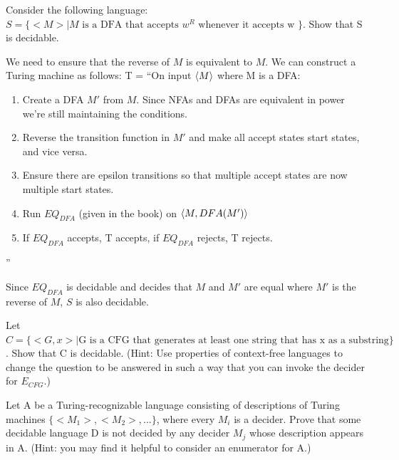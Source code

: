 \begin{problem}{3}
  Consider the following language: $S = \{<M> | M \text{ is a DFA that accepts } w^R \text{ whenever it accepts w }\}$. Show that S is
  decidable.
  \begin{solution}
    We need to ensure that the reverse of $M$ is equivalent to $M$. We can construct a Turing machine as follows:
    T = ``On input $\left \langle M \right \rangle $ where M is a DFA:
    \begin{enumerate}
      \item Create a DFA $M'$ from $M$. Since NFAs and DFAs are equivalent in power we're still maintaining the conditions.\\
      \item Reverse the transition function in $M'$ and make all accept states start states, and vice versa.\\
      \item Ensure there are epsilon transitions so that multiple accept states are now multiple start states.\\
      \item Run $EQ_{DFA}$ (given in the book) on $\left \langle M, DFA(M') \right \rangle $\\
      \item If $EQ_{DFA}$ accepts, T accepts, if $EQ_{DFA}$ rejects, T rejects.\\
    \end{enumerate}
    ''

    \noindent Since $EQ_{DFA}$ is decidable and decides that $M$ and $M'$ are equal where $M'$ is the reverse of $M$, $S$ is also
    decidable.
  \end{solution}
\end{problem}

\begin{problem}{4}
  Let $C = \{<G,x> | \text{G is a CFG that generates at least one string that has x as a substring}\}$. Show that C is decidable.
  (Hint: Use properties of context-free languages to change the question to be answered in such a way that you can
  invoke the decider for $E_{CFG}$.)
\end{problem}

\begin{problem}{5}
  Let A be a Turing-recognizable language consisting of descriptions of Turing machines $\{<M_1>, <M_2>,...\}$, where
  every $M_i$ is a decider. Prove that some decidable language D is not decided by any decider $M_j$ whose description
  appears in A. (Hint: you may find it helpful to consider an enumerator for A.)
\end{problem}

